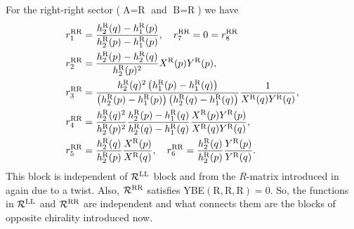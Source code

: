 \documentclass[12pt,a4paper]{article}
\numberwithin{equation}{section}
\newcommand{\lR}{\mathcal{R}}
\newcommand{\tA}{\text{A}}
\newcommand{\tB}{\text{B}}
\newcommand{\tR}{\text{R}}
\begin{document}
For the right-right sector ($ \tA=\tR $ and $ \tB=\tR $) we have
%
\begin{align}
& r_1^{{\rm RR}}=\frac{h_2^{{\rm R}}(q)-h_1^{{\rm R}}(p)}{h_2^{{\rm R}}(p)-h_1^{{\rm R}}(p)},\quad r_7^{{\rm RR}}=0=r_8^{{\rm RR}}\\
& r_2^{{\rm RR}}=\frac{h_2^{{\rm R}}(p)-h_2^{{\rm R}}(q)}{h_2^{{\rm R}}(p)^2}X^{{\rm R}}(p)Y^{{\rm R}}(p),\\
& r_3^{{\rm RR}}=\frac{h_2^{{\rm R}}(q)^2\left(h_1^{{\rm R}}(p)-h_1^{{\rm R}}(q)\right)}{\left(h_2^{{\rm R}}(p)-h_1^{{\rm R}}(p)\right)\left(h_2^{{\rm R}}(q)-h_1^{{\rm R}}(q)\right)}\frac{1}{X^{{\rm R}}(q)Y^{{\rm R}}(q)},\\
& r_4^{{\rm RR}}=\frac{h_2^{{\rm R}}(q)^2}{h_2^{{\rm R}}(p)^2}\frac{h_2^{{\rm R}}(p)-h_1^{{\rm R}}(q)}{h_2^{{\rm R}}(q)-h_1^{{\rm R}}(q)}\frac{X^{{\rm R}}(p)Y^{{\rm R}}(p)}{X^{{\rm R}}(q)Y^{{\rm R}}(q)},\\
& r_5^{{\rm RR}}=\frac{h_2^{{\rm R}}(q)}{h_2^{{\rm R}}(p)}\frac{X^{{\rm R}}(p)}{X^{{\rm R}}(q)},\quad r_6^{{\rm RR}}=\frac{h_2^{{\rm R}}(q)}{h_2^{{\rm R}}(p)}\frac{Y^{{\rm R}}(p)}{Y^{{\rm R}}(q)}.
\end{align}
This block is independent of $ \lR^{{\rm LL}} $ block and from the $ R $-matrix introduced in \cite{deLeeuw:2020ahe} again due to a twist. Also, $ \lR^{{\rm RR}} $ satisfies YBE$ (\tR,\tR,\tR)=0$.
So, the functions in $ \lR^{{\rm LL}} $ and $ \lR^{{\rm RR}} $ are independent and what connects them are the blocks of opposite chirality introduced now.
\end{document}
